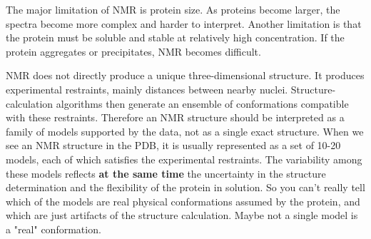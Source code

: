 The major limitation of NMR is protein size. As proteins become larger, the spectra become more complex and harder to interpret. Another limitation is that the protein must be soluble and stable at relatively high concentration. If the protein aggregates or precipitates, NMR becomes difficult.

NMR does not directly produce a unique three-dimensional structure. It produces experimental restraints, mainly distances between nearby nuclei. Structure-calculation algorithms then generate an ensemble of conformations compatible with these restraints. Therefore an NMR structure should be interpreted as a family of models supported by the data, not as a single exact structure. 
When we see an NMR structure in the PDB, it is usually represented as a set of 10-20 models, each of which satisfies the experimental restraints. The variability among these models reflects \textbf{at the same time} the uncertainty in the structure determination and the flexibility of the protein in solution. So you can't really tell which of the models are real physical conformations assumed by the protein, 
and which are just artifacts of the structure calculation. Maybe not a single model is a "real" conformation.

\newpage

